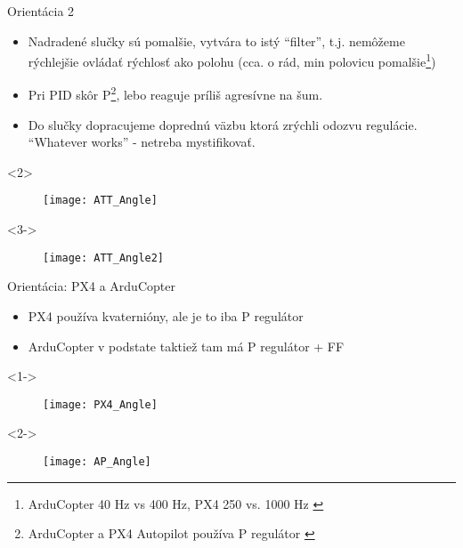 \begin{frame}[t]{Orientácia 2}
\begin{itemize}
  \item<1-> Nadradené slučky sú pomalšie, vytvára to istý ``filter'', t.j. nemôžeme rýchlejšie ovládať rýchlosť ako polohu (cca. o rád, min polovicu pomalšie\footnote{ArduCopter 40 Hz vs 400 Hz, PX4 250 vs. 1000 Hz \citep{AP:PID,PX4:PID}}) \citep{AP:PID,PX4:PID}
  \item<2-> Pri PID skôr P\footnote{ArduCopter a PX4 Autopilot používa P regulátor \citep{PX4:PID,AP:PIDDOC}}, lebo reaguje príliš agresívne na šum.
  \item<3-> Do slučky dopracujeme doprednú väzbu  ktorá zrýchli odozvu regulácie. ``Whatever works'' - netreba mystifikovať.
  \end{itemize}



  \begin{onlyenv}<2>
  \begin{figure}
\centering
  \texttt{[image: ATT\_Angle]}\\
\end{figure}
\end{onlyenv}

  \begin{onlyenv}<3->
\begin{figure}
\centering
  \texttt{[image: ATT\_Angle2]}\\
 \end{figure}
\end{onlyenv}

  \end{frame}



  \begin{frame}[t]{Orientácia: PX4 a ArduCopter}
\begin{itemize}
  \item<1-> PX4 používa kvaternióny, ale je to iba P regulátor
  \item<2-> ArduCopter v podstate taktiež tam má P regulátor + FF
\end{itemize}

  \begin{onlyenv}<1->
  \begin{figure}
\centering
  \texttt{[image: PX4\_Angle]}\\
\end{figure}
\end{onlyenv}


  \begin{onlyenv}<2->
  \begin{figure}
\centering
  \texttt{[image: AP\_Angle]}\\
\end{figure}
\end{onlyenv}

  \end{frame}
  
